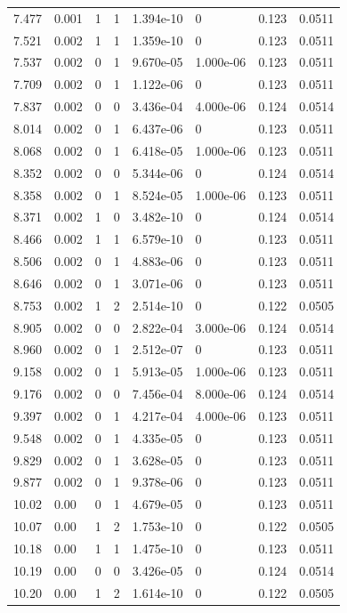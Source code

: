 \documentclass[preview]{standalone}
\begin{document}
{{{\begin{tabular}{L{1.2cm}C{1.2cm} C{0.3cm}C{0.5cm} C{1.4cm}C{1.4cm} C{1.4cm}C{1.4cm}}
  7.477  &  0.001  & 1     &  1 &  1.394e-10  & 0  & 0.123 &  0.0511   \\ 
  7.521  &  0.002  & 1     &  1 &  1.359e-10  & 0  & 0.123 &  0.0511   \\ 
  7.537  &  0.002  & 0     &  1 &  9.670e-05  & 1.000e-06  & 0.123 &  0.0511   \\ 
  7.709  &  0.002  & 0     &  1 &  1.122e-06  & 0  & 0.123 &  0.0511   \\ 
  7.837  &  0.002  & 0     &  0 &  3.436e-04  & 4.000e-06  & 0.124 &  0.0514   \\ 
  8.014  &  0.002  & 0     &  1 &  6.437e-06  & 0  & 0.123 &  0.0511   \\ 
  8.068  &  0.002  & 0     &  1 &  6.418e-05  & 1.000e-06  & 0.123 &  0.0511   \\ 
  8.352  &  0.002  & 0     &  0 &  5.344e-06  & 0  & 0.124 &  0.0514   \\ 
  8.358  &  0.002  & 0     &  1 &  8.524e-05  & 1.000e-06  & 0.123 &  0.0511   \\ 
  8.371  &  0.002  & 1     &  0 &  3.482e-10  & 0  & 0.124 &  0.0514   \\ 
  8.466  &  0.002  & 1     &  1 &  6.579e-10  & 0  & 0.123 &  0.0511   \\ 
  8.506  &  0.002  & 0     &  1 &  4.883e-06  & 0  & 0.123 &  0.0511   \\ 
  8.646  &  0.002  & 0     &  1 &  3.071e-06  & 0  & 0.123 &  0.0511   \\ 
  8.753  &  0.002  & 1     &  2 &  2.514e-10  & 0  & 0.122 &  0.0505   \\ 
  8.905  &  0.002  & 0     &  0 &  2.822e-04  & 3.000e-06  & 0.124 &  0.0514   \\ 
  8.960  &  0.002  & 0     &  1 &  2.512e-07  & 0  & 0.123 &  0.0511   \\ 
  9.158  &  0.002  & 0     &  1 &  5.913e-05  & 1.000e-06  & 0.123 &  0.0511   \\ 
  9.176  &  0.002  & 0     &  0 &  7.456e-04  & 8.000e-06  & 0.124 &  0.0514   \\ 
  9.397  &  0.002  & 0     &  1 &  4.217e-04  & 4.000e-06  & 0.123 &  0.0511   \\ 
  9.548  &  0.002  & 0     &  1 &  4.335e-05  & 0  & 0.123 &  0.0511   \\ 
  9.829  &  0.002  & 0     &  1 &  3.628e-05  & 0  & 0.123 &  0.0511   \\ 
  9.877  &  0.002  & 0     &  1 &  9.378e-06  & 0  & 0.123 &  0.0511   \\ 
  10.02  &  0.00  & 0     &  1 &  4.679e-05  & 0  & 0.123 &  0.0511   \\ 
  10.07  &  0.00  & 1     &  2 &  1.753e-10  & 0  & 0.122 &  0.0505   \\ 
  10.18  &  0.00  & 1     &  1 &  1.475e-10  & 0  & 0.123 &  0.0511   \\ 
  10.19  &  0.00  & 0     &  0 &  3.426e-05  & 0  & 0.124 &  0.0514   \\ 
  10.20  &  0.00  & 1     &  2 &  1.614e-10  & 0  & 0.122 &  0.0505   \\ 
\hline 
\end{tabular} 

}}}
\end{document}
